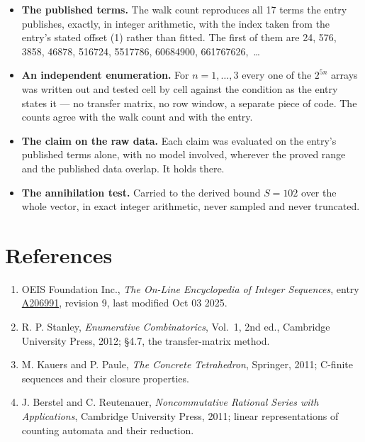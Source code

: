 \documentclass[11pt]{article}
\theoremstyle{definition}
\begin{document}
\begin{itemize}

\item {\bfseries The published terms.} The walk count reproduces all 17 terms the entry publishes, exactly, in integer arithmetic, with the index taken from the entry's stated offset (1) rather than fitted. The first of them are 24, 576, 3858, 46878, 516724, 5517786, 60684900, 661767626,~\dots

\item {\bfseries An independent enumeration.} For $n = 1,\dots,3$ every one of the $2^{5n}$ arrays was written out and tested cell by cell against the condition as the entry states it --- no transfer matrix, no row window, a separate piece of code. The counts agree with the walk count and with the entry.

\item {\bfseries The claim on the raw data.} Each claim was evaluated on the entry's published terms alone, with no model involved, wherever the proved range and the published data overlap. It holds there.

\item {\bfseries The annihilation test.} Carried to the derived bound $S = 102$ over the whole vector, in exact integer arithmetic, never sampled and never truncated.

\end{itemize}

\section{References}

\begin{enumerate}

\item OEIS Foundation Inc., \emph{The On-Line Encyclopedia of Integer Sequences}, entry \href{https://oeis.org/A206991}{A206991}, revision 9, last modified Oct 03 2025.

\item R. P. Stanley, \emph{Enumerative Combinatorics}, Vol.~1, 2nd ed., Cambridge University Press, 2012; \S4.7, the transfer-matrix method.

\item M. Kauers and P. Paule, \emph{The Concrete Tetrahedron}, Springer, 2011; C-finite sequences and their closure properties.

\item J. Berstel and C. Reutenauer, \emph{Noncommutative Rational Series with Applications}, Cambridge University Press, 2011; linear representations of counting automata and their reduction.

\end{enumerate}
\end{document}
